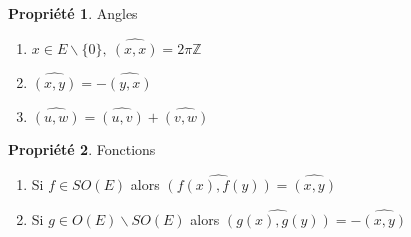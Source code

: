 \documentclass[fleqn]{article}
\theoremstyle{definition} \newtheorem*{defi}{D\'efinition}
\theoremstyle{definition} \newtheorem*{theo}{Th\'eor\`eme}
\theoremstyle{definition} \newtheorem*{coro}{Corollaire}
\theoremstyle{remark} \newtheorem*{rqs}{Remarques}
\theoremstyle{definition} \newtheorem*{prop}{Propri\'et\'e}
\begin{document}
\begin{prop} Angles
	\begin{enumerate}
		\item $x \in E \backslash \{0\},\ \hat{(x,x)} = 2\pi\mathbb{Z}$
		\item $\hat{(x,y)} = -\hat{(y,x)}$
		\item $\hat{(u,w)} = \hat{(u,v)} + \hat{(v,w)}$
	\end{enumerate}
\end{prop}

\begin{prop} Fonctions
	\begin{enumerate}
		\item Si $f \in SO(E)$ alors $\hat{(f(x), f(y))} = \hat{(x,y)}$
		\item Si $g \in O(E) \backslash SO(E)$ alors $\hat{(g(x),g(y))} = -\hat{(x,y)}$
	\end{enumerate}
\end{prop}
\end{document}
